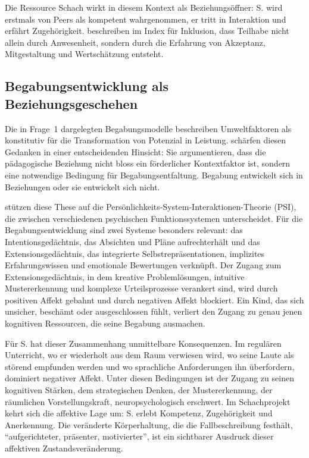 \documentclass[ngerman, a4paper]{article}
\begin{document}
Die Ressource Schach wirkt in diesem Kontext als Beziehungsöffner: S. wird erstmals
von Peers als kompetent wahrgenommen, er tritt in Interaktion und erfährt Zugehörigkeit.
\textcite[Dim.\,A--B]{booth2019index} beschreiben im Index für Inklusion, dass Teilhabe nicht allein durch
Anwesenheit, sondern durch die Erfahrung von Akzeptanz, Mitgestaltung und
Wertschätzung entsteht.

\subsection{Begabungsentwicklung als Beziehungsgeschehen}

Die in Frage~1 dargelegten Begabungsmodelle beschreiben Umweltfaktoren als
konstitutiv für die Transformation von Potenzial in Leistung. \textcite[S.\,35--57]{kuhl2019diversitaet}
schärfen diesen Gedanken in einer entscheidenden Hinsicht: Sie argumentieren, dass
die pädagogische Beziehung nicht bloss ein förderlicher Kontextfaktor ist, sondern
eine notwendige Bedingung für Begabungsentfaltung. Begabung entwickelt sich in
Beziehungen oder sie entwickelt sich nicht.

\textcite[S.\,35--57]{kuhl2019diversitaet} stützen diese These auf die Persönlichkeits-System-Interaktionen-Theorie (PSI),
die zwischen verschiedenen psychischen Funktionssystemen unterscheidet. Für die
Begabungsentwicklung sind zwei Systeme besonders relevant: das Intentionsgedächtnis,
das Absichten und Pläne aufrechterhält und das Extensionsgedächtnis, das integrierte
Selbstrepräsentationen, implizites Erfahrungswissen und emotionale Bewertungen
verknüpft. Der Zugang zum Extensionsgedächtnis, in dem kreative Problemlösungen,
intuitive Mustererkennung und komplexe Urteilsprozesse verankert sind, wird durch
positiven Affekt gebahnt und durch negativen Affekt blockiert. Ein Kind, das sich
unsicher, beschämt oder ausgeschlossen fühlt, verliert den Zugang zu genau jenen
kognitiven Ressourcen, die seine Begabung ausmachen.

Für S. hat dieser Zusammenhang unmittelbare Konsequenzen. Im regulären Unterricht,
wo er wiederholt aus dem Raum verwiesen wird, wo seine Laute als störend empfunden
werden und wo sprachliche Anforderungen ihn überfordern, dominiert negativer Affekt.
Unter diesen Bedingungen ist der Zugang zu seinen kognitiven Stärken, dem
strategischen Denken, der Mustererkennung, der räumlichen Vorstellungskraft,
neuropsychologisch erschwert. Im Schachprojekt kehrt sich die affektive Lage um:
S. erlebt Kompetenz, Zugehörigkeit und Anerkennung. Die veränderte Körperhaltung,
die die Fallbeschreibung festhält, \enquote{aufgerichteter, präsenter, motivierter},
ist ein sichtbarer Ausdruck dieser affektiven Zustandsveränderung.
\end{document}
